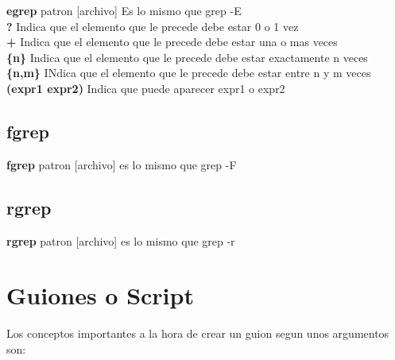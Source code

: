 \documentclass[11pt]{article}
\begin{document}
\textbf{egrep} patron [archivo] \hspace{2cm} Es lo mismo que grep -E\\

\hspace{2cm} \textbf{?}\hspace{2cm} Indica que el elemento que le precede debe estar 0 o 1 vez\\

\hspace{2cm} \textbf{+}\hspace{2cm} Indica que el elemento que le precede debe estar una o mas veces\\
 
 \hspace{2cm} \textbf{\{n\}}\hspace{2cm} Indica que el elemento que le precede debe estar exactamente n veces \\
 
 \hspace{2cm} \textbf{\{n,m\}}\hspace{2cm} INdica que el elemento que le precede debe estar entre n y m veces \\
 
 \hspace{2cm} \textbf{(expr1 \textbar expr2)}\hspace{2cm} Indica que puede aparecer expr1 o expr2\\
 
 \subsection{fgrep}
 
 \textbf{fgrep} patron [archivo] \hspace{2cm} es lo mismo que grep -F\\
 
 \subsection{rgrep}
 
 \textbf{rgrep} patron [archivo] \hspace{2cm} es lo mismo que grep -r\\
 
 
 \section{Guiones o Script}
 
Los conceptos importantes a la hora de crear un guion segun unos argumentos son: \\
\end{document}

